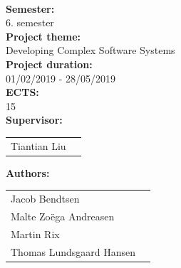 \newpage
\makeatother
\begin{minipage}[T]{0.45\textwidth}
 \begin{flushleft}
  \textbf{\normalsize{}}\\ \maketitle
  \textbf{\normalsize{Semester:}}\\6. semester\\
  \textbf{\normalsize{Project theme:}}\\Developing Complex Software Systems\\
  \textbf{\normalsize{Project duration:}}\\01/02/2019 - 28/05/2019\\
  \textbf{\normalsize{ECTS:}}\\15\\
  \textbf{\normalsize{Supervisor:}}\\
  \begin{tabular}{ll}
    \normalsize{Tiantian Liu}\\
  \end{tabular}

  \textbf{\normalsize{Authors:}}\\
  \begin{tabular}{ll}
   \normalsize{Jacob Bendtsen}\\
   \normalsize{Malte Zoëga Andreasen}\\
   \normalsize{Martin Rix}\\
   \normalsize{Thomas Lundsgaard Hansen}\\
  \end{tabular}
 \end{flushleft}
\end{minipage}
 ~
